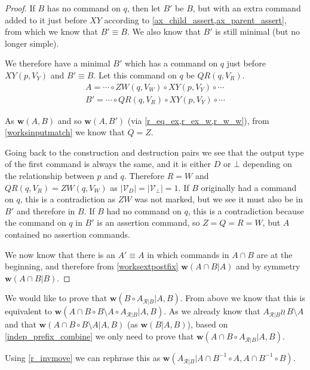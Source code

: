 \documentclass[12pt]{article}
\newcommand{\setvx}[1]{\mathcal{V}_{#1}}
\newcommand{\setd}{\setvx{D}} %
\newcommand{\setb}{\setvx{\empt}} %
\newcommand{\empt}{\bot}
\newcommand{\fscommand}[2]{{#1#2}}
\newcommand{\cxy}{\fscommand{X}{Y}}
\newcommand{\czw}{\fscommand{Z}{W}}
\newcommand{\cqr}{\fscommand{Q}{R}}
\newcommand{\cc}{\circ} %
\newcommand{\indep}{\wr\!\!\wr\,} %
\newcommand{\works}[1]{{\mathbf{w}}({#1})}
\newcommand{\worksc}[2]{{\mathbf{w}}({#1}|{#2})}
\newcommand{\ordered}[1]{#1}
\newcommand{\recchar}[3]{{#1}^{#3}_{\mathcal{R}|{#2}}}
\newcommand{\reca}{\recchar{A}{B}{}} %
\theoremstyle{definition}
\begin{document}
\begin{proof}
If $B$ has no command on $q$, then let $B'$ be $B$, but with an extra command added to it just before $\cxy$
according to \cref{ax_child_assert,ax_parent_assert}, from which we know
that $B'\equiv B$.
We also know that $B'$ is still minimal (but no longer simple).

We therefore have a minimal $B'$ which has a command on $q$ just before $\cxy(p, V_Y)$ and $B'\equiv B$.
Let this command on $q$ be $\cqr(q, V_R)$.
\begin{gather*}
A = \cdots\cc  \czw(q, V_W)\cc  \cxy(p, V_Y)\cc  \cdots \\
B' = \cdots\cc  \cqr(q, V_R)\cc  \cxy(p, V_Y)\cc  \cdots
\end{gather*}

As $\works{A,B}$ and so $\works{A,B'}$ (via \cref{r_eq_ex,r_ex_w,r_w_w}), 
from \cref{worksinputmatch}
we know that $Q=Z$. 

Going back to the construction and destruction pairs we see that the output type of the first command
is always the same, and it is either $D$ or $\empt$ depending on the relationship between $p$ and $q$.
Therefore $R=W$ and $\cqr(q, V_R)=\czw(q, V_W)$
as $|\setd|=|\setb|=1$. 
If $B$ originally had a command on $q$,
this is a contradiction as $\czw$ was not marked, but we see it must also be in $B'$ and therefore in $B$.
If $B$ had no command on $q$,
this is a contradiction because the command on $q$ in $B'$ is an assertion command, so $Z=Q=R=W$, 
but $A$ contained no assertion commands.

\medskip

We now know that there is an $A'\equiv A$ in which commands in $A\cap B$
are at the beginning, and therefore 
from \cref{worksextpostfix}
$\worksc{\ordered{A\cap B}}{A}$ and by symmetry $\worksc{\ordered{A\cap B}}{B}$.
\end{proof}

\medskip

We would like to prove that $\worksc{B\cc \reca}{A,B}$.
From above we know that this is equivalent to
$\worksc{\ordered{A\cap B}\cc \ordered{B\setminus A}\cc \reca}{A,B}$.
As we already know that $\reca\indep B\setminus A$
and that $\worksc{\ordered{A\cap B}\cc \ordered{B\setminus A}}{A,B}$
(as $\worksc{B}{A,B}$),
based on \cref{indep_prefix_combine}
we only need to prove that
$\worksc{\ordered{A\cap B}\cc \reca}{A,B}$.

\newcommand{\acbi}{\ordered{A\cap B}^{-1}}
\newcommand{\amb}{A\setminus B}
\newcommand{\bma}{B\setminus A}
Using \cref{r_invmove} we can rephrase this as
$\worksc{\reca}{\acbi\cc A,\acbi\cc B}$.
\end{document}
